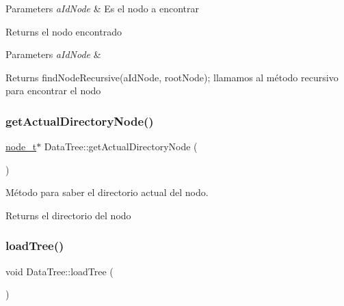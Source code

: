 \begin{DoxyParams}{Parameters}
{\em a\+Id\+Node} & Es el nodo a encontrar \\
\hline
\end{DoxyParams}
\begin{DoxyReturn}{Returns}
el nodo encontrado
\end{DoxyReturn}

\begin{DoxyParams}{Parameters}
{\em a\+Id\+Node} & \\
\hline
\end{DoxyParams}
\begin{DoxyReturn}{Returns}
find\+Node\+Recursive(a\+Id\+Node, root\+Node); llamamos al método recursivo para encontrar el nodo 
\end{DoxyReturn}
\mbox{\label{classDataTree_a65a382929fed2fe66ec7b245eba4700d}} 
\subsubsection{\texorpdfstring{get\+Actual\+Directory\+Node()}{getActualDirectoryNode()}}
{\footnotesize\ttfamily \hyperlink{structnode__t}{node\+\_\+t}$\ast$ Data\+Tree\+::get\+Actual\+Directory\+Node (\begin{DoxyParamCaption}{ }\end{DoxyParamCaption})\hspace{0.3cm}{\ttfamily [inline]}}



Método para saber el directorio actual del nodo. 

\begin{DoxyReturn}{Returns}
el directorio del nodo 
\end{DoxyReturn}
\mbox{\label{classDataTree_ade69ae1d6b9c9c0b61abcb397fef1484}} 
\subsubsection{\texorpdfstring{load\+Tree()}{loadTree()}}
{\footnotesize\ttfamily void Data\+Tree\+::load\+Tree (\begin{DoxyParamCaption}{ }\end{DoxyParamCaption})}



